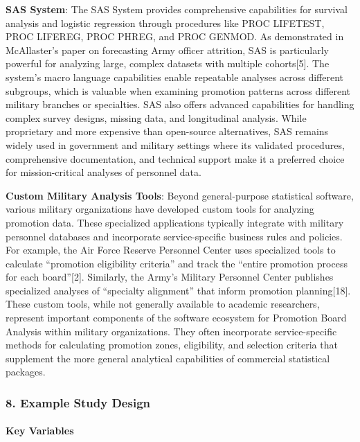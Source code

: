 \documentclass[./main.tex]{subfiles}
\begin{document}
\textbf{SAS System}: The SAS System provides comprehensive capabilities
for survival analysis and logistic regression through procedures like
PROC LIFETEST, PROC LIFEREG, PROC PHREG, and PROC GENMOD. As
demonstrated in McAllaster's paper on forecasting Army officer
attrition, SAS is particularly powerful for analyzing large, complex
datasets with multiple cohorts{[}5{]}. The system's macro language
capabilities enable repeatable analyses across different subgroups,
which is valuable when examining promotion patterns across different
military branches or specialties. SAS also offers advanced capabilities
for handling complex survey designs, missing data, and longitudinal
analysis. While proprietary and more expensive than open-source
alternatives, SAS remains widely used in government and military
settings where its validated procedures, comprehensive documentation,
and technical support make it a preferred choice for mission-critical
analyses of personnel data.

\textbf{Custom Military Analysis Tools}: Beyond general-purpose
statistical software, various military organizations have developed
custom tools for analyzing promotion data. These specialized
applications typically integrate with military personnel databases and
incorporate service-specific business rules and policies. For example,
the Air Force Reserve Personnel Center uses specialized tools to
calculate ``promotion eligibility criteria'' and track the ``entire
promotion process for each board''{[}2{]}. Similarly, the Army's
Military Personnel Center publishes specialized analyses of ``specialty
alignment'' that inform promotion planning{[}18{]}. These custom tools,
while not generally available to academic researchers, represent
important components of the software ecosystem for Promotion Board
Analysis within military organizations. They often incorporate
service-specific methods for calculating promotion zones, eligibility,
and selection criteria that supplement the more general analytical
capabilities of commercial statistical packages.

\subsubsection{8. Example Study Design}\label{example-study-design}

\paragraph{Key Variables}\label{key-variables}
\end{document}
